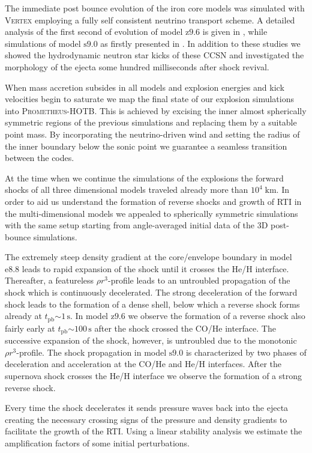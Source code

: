 \documentclass[fleqn,usenatbib]{mnras}
\newcommand{\tpb}{\ensuremath{t_{\text{pb}}}}
\newcommand{\s}{\ensuremath{\text{s}}}
\newcommand{\prom}{\textsc{Prometheus-HOTB}\xspace}
\newcommand{\vertex}{\textsc{Vertex}\xspace}
\newcommand{\onemg}{\ensuremath{\mathrm{e8.8}}\xspace}
\newcommand{\snine}{\ensuremath{\mathrm{s9.0}}\xspace}
\newcommand{\znine}{\ensuremath{\mathrm{z9.6}}\xspace}
\begin{document}
The immediate post bounce evolution of the iron core models was 
simulated with \vertex employing a fully self consistent neutrino 
transport scheme. A detailed analysis of the first second of 
evolution of model \znine is given in \citet{Melson2015a}, 
while simulations of model \snine as firstly presented in \citet{Melson2019}. 
In addition to these studies we showed the 
hydrodynamic neutron star kicks of these 
CCSN and investigated the morphology of the ejecta some 
hundred milliseconds after shock revival. 

When mass accretion subsides in all models and 
explosion energies and kick velocities begin to saturate 
we map the final state of our explosion simulations into \prom. 
This is achieved by excising the inner almost spherically symmetric 
regions of the previous simulations and replacing them by a 
suitable point mass. By incorporating the neutrino-driven wind
and setting the radius of the inner boundary below the sonic 
point we guarantee a seamless transition between the codes.

At the time when we continue the simulations of the explosions 
the forward shocks of all three dimensional models traveled 
already more than $10^4\;\mathrm{km}$. 
In order to aid us understand the formation of reverse shocks and
growth of RTI in the multi-dimensional models we appealed to spherically
symmetric simulations with the same setup starting from angle-averaged initial data
of the 3D post-bounce simulations.

The extremely steep density gradient at the core/envelope boundary
in model \onemg leads to rapid expansion 
of the shock until it crosses the He/H interface.
Thereafter, a featureless $\rho r^3$-profile leads to an untroubled 
propagation of the shock which is continuously decelerated.
The strong deceleration of the forward shock leads to the formation of a 
dense shell, below which a reverse shock forms already at $\tpb\mathord{\sim}1\,\s$.
In model \znine we observe the formation of a reverse shock also fairly early at
$\tpb\mathord{\sim}100\,\s$ after the shock crossed the CO/He interface.
The successive expansion of the shock, however, is untroubled due to the 
monotonic $\rho r^3$-profile.
The shock propagation in model \snine is characterized by two phases of
deceleration and acceleration at the CO/He and He/H interfaces.
After the supernova shock crosses the He/H interface we observe the
formation of a strong reverse shock.

Every time the shock decelerates it sends pressure waves back into
the ejecta creating the necessary crossing signs of the
pressure and density gradients to facilitate the growth of the RTI. 
Using a linear stability analysis we estimate the amplification
factors of some initial perturbations.
\end{document}
